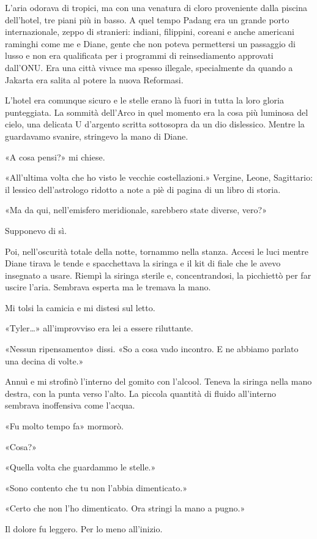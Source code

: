 L'aria odorava di tropici, ma con una venatura di cloro proveniente
dalla piscina dell'hotel, tre piani più in basso. A quel tempo Padang
era un grande porto internazionale, zeppo di stranieri: indiani,
filippini, coreani e anche americani raminghi come me e Diane, gente che
non poteva permettersi un passaggio di lusso e non era qualificata per i
programmi di reinsediamento approvati dall'ONU. Era una città vivace ma
spesso illegale, specialmente da quando a Jakarta era salita al potere
la nuova Reformasi.

L'hotel era comunque sicuro e le stelle erano là fuori in tutta la loro
gloria punteggiata. La sommità dell'Arco in quel momento era la cosa più
luminosa del cielo, una delicata U d'argento scritta sottosopra da un
dio dislessico. Mentre la guardavamo svanire, stringevo la mano di
Diane.

«A cosa pensi?» mi chiese.

«All'ultima volta che ho visto le vecchie costellazioni.» Vergine,
Leone, Sagittario: il lessico dell'astrologo ridotto a note a piè di
pagina di un libro di storia.

«Ma da qui, nell'emisfero meridionale, sarebbero state diverse, vero?»

Supponevo di sì.

Poi, nell'oscurità totale della notte, tornammo nella stanza. Accesi le
luci mentre Diane tirava le tende e spacchettava la siringa e il kit di
fiale che le avevo insegnato a usare. Riempì la siringa sterile e,
concentrandosi, la picchiettò per far uscire l'aria. Sembrava esperta ma
le tremava la mano.

Mi tolsi la camicia e mi distesi sul letto.

«Tyler\ldots» all'improvviso era lei a essere riluttante.

«Nessun ripensamento» dissi. «So a cosa vado incontro. E ne abbiamo
parlato una decina di volte.»

Annuì e mi strofinò l'interno del gomito con l'alcool. Teneva la siringa
nella mano destra, con la punta verso l'alto. La piccola quantità di
fluido all'interno sembrava inoffensiva come l'acqua.

«Fu molto tempo fa» mormorò.

«Cosa?»

«Quella volta che guardammo le stelle.»

«Sono contento che tu non l'abbia dimenticato.»

«Certo che non l'ho dimenticato. Ora stringi la mano a pugno.»

Il dolore fu leggero. Per lo meno all'inizio.
